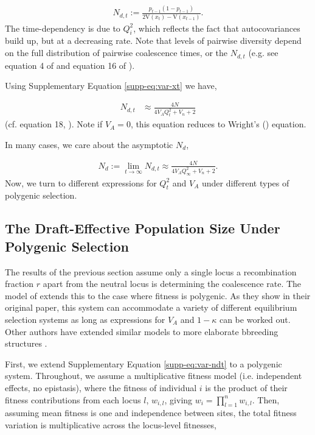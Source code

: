 \documentclass[11pt]{article}
\newcommand{\V}{\text{V}}
\begin{document}
\begin{align}
    N_{d,t} := \frac{p_{t-1} (1-p_{t-1})}{2\V(x_t) - \V(x_{t-1})}.
\end{align}
%
The time-dependency is due to $Q_i^2$, which reflects the fact that
autocovariances build up, but at a decreasing rate. Note that levels of
pairwise diversity depend on the full distribution of pairwise coalescence
times, or the $N_{d,t}$ (e.g. see equation 4 of \cite{Santiago2016-mu} and
equation 16 of \cite{Santiago1998-bs}).

Using Supplementary Equation \eqref{supp-eq:var-xt} we have,

\begin{align}
    \label{supp-eq:var-ndt}
    N_{d,t} &\approx \frac{4N}{4 V_A Q_t^2 +V_n+2}
\end{align}
%
(cf. equation 18, \cite{Santiago1995-hx}). Note if $V_A = 0$, this equation
reduces to Wright's (\citeyear{Wright1938-tv}) equation. 

In many cases, we care about the asymptotic $N_d$, 

\begin{align}
    N_d := \lim_{t \to \infty} N_{d,t} \approx \frac{4N}{4 V_A Q_\infty^2 +V_n+2}.
\end{align}
%
Now, we turn to different expressions for $Q_t^2$ and $V_A$ under different
types of polygenic selection.

\subsection{The Draft-Effective Population Size Under Polygenic Selection}
\label{supp:ne-polygenic}

The results of the previous section assume only a single locus a recombination
fraction $r$ apart from the neutral locus is determining the coalescence rate. The
model of \textcite{Santiago1998-bs} extends this to the case where fitness is
polygenic. As they show in their original paper, this system can accommodate a
variety of different equilibrium selection systems as long as expressions for
$V_A$ and $1-\kappa$ can be worked out. Other authors have extended similar models to
more elaborate bbreeding structures \parencite{Wray1990-zf,Woolliams1993-qo}.

First, we extend Supplementary Equation \eqref{supp-eq:var-ndt} to a polygenic
system. Throughout, we assume a multiplicative fitness model (i.e. independent
effects, no epistasis), where the fitness of individual $i$ is the product of
their fitness contributions from each locus $l$, $w_{i,l}$, giving $w_i =
\prod_{l=1}^n w_{i,l}$. Then, assuming mean fitness is one and independence
between sites, the total fitness variation is multiplicative across the
locus-level fitnesses,
\end{document}
